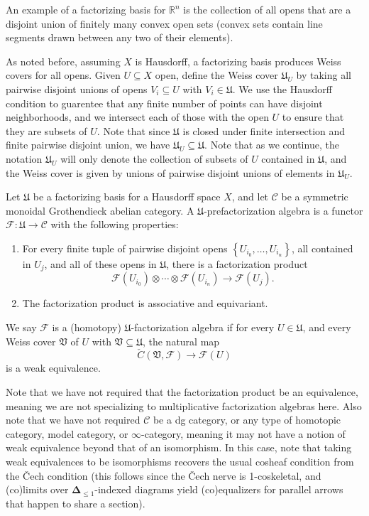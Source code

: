 An example of a factorizing basis for $\mathbb{R} ^n$ is the collection of all opens that are a disjoint union of finitely many convex open sets (convex sets contain line segments drawn between any two of their elements).

As noted before, assuming $X$ is Hausdorff, a factorizing basis produces Weiss covers for all opens. Given $U\subseteq X$ open, define the Weiss cover $\mathfrak{U} _U$ by taking all pairwise disjoint unions of opens $V_i \subseteq U$ with $V_i\in \mathfrak{U} $. We use the Hausdorff condition to guarentee that any finite number of points can have disjoint neighborhoods, and we intersect each of those with the open $U$ to ensure that they are subsets of $U$. Note that since $\mathfrak{U} $ is closed under finite intersection and finite pairwise disjoint union, we have $\mathfrak{U} _U \subseteq \mathfrak{U} $. Note that as we continue, the notation $\mathfrak{U} _U$ will only denote the collection of subsets of $U$ contained in $\mathfrak{U} $, and the Weiss cover is given by unions of pairwise disjoint unions of elements in $\mathfrak{U} _U$.

\begin{definition}\label{dfn:6-2-1}
	Let $\mathfrak{U} $ be a factorizing basis for a Hausdorff space $X$, and let $\mathcal{C} $ be a symmetric monoidal Grothendieck abelian category. A $\mathfrak{U} $-prefactorization algebra is a functor $\mathcal{F} : \mathfrak{U}  \to \mathcal{C} $ with the following properties:
	\begin{enumerate}
		\item For every finite tuple of pairwise disjoint opens $\left\{ U_{i_0} , \ldots , U_{i_n}  \right\}$, all contained in $U_j$, and all of these opens in $\mathfrak{U} $, there is a factorization product
			\[
				\mathcal{F} (U_{i_0} )\otimes \cdots \otimes \mathcal{F} (U_{i_n} )\to \mathcal{F} (U_j)
			.\]
		\item The factorization product is associative and equivariant.
	\end{enumerate}
	We say $\mathcal{F} $ is a (homotopy) $\mathfrak{U} $-factorization algebra if for every $U\in \mathfrak{U} $, and every Weiss cover $\mathfrak{V} $ of $U$ with $\mathfrak{V} \subseteq \mathfrak{U} $, the natural map
	\[
		\check{C}(\mathfrak{V} ,\mathcal{F} )\to \mathcal{F} (U)
	\]
	is a weak equivalence.
\end{definition}
Note that we have not required that the factorization product be an equivalence, meaning we are not specializing to multiplicative factorization algebras here. Also note that we have not required $\mathcal{C} $ be a dg category, or any type of homotopic category, model category, or $\infty $-category, meaning it may not have a notion of weak equivalence beyond that of an isomorphism. In this case, note that taking weak equivalences to be isomorphisms recovers the usual cosheaf condition from the \v{C}ech condition (this follows since the \v{C}ech nerve is 1-coskeletal, and (co)limits over $\boldsymbol{\Delta} _{\leq 1} $-indexed diagrams yield (co)equalizers for parallel arrows that happen to share a section).

